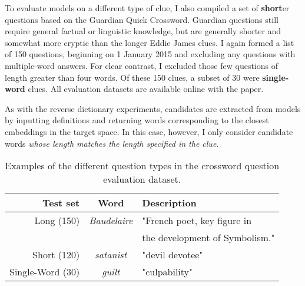 To evaluate models on a different type of clue, I also compiled a set of {\bf short}er questions based on the Guardian Quick Crossword. Guardian questions still require general factual or linguistic knowledge, but are generally shorter and somewhat more cryptic than the longer Eddie James clues. I again formed a list of 150 questions, beginning on 1 January 2015 and excluding any questions with multiple-word answers. For clear contrast, I excluded those few questions of length greater than four words. Of these 150 clues, a subset of 30 were {\bf single-word} clues. All evaluation datasets are available online with the paper. 

As with the reverse dictionary experiments, candidates are extracted from models by inputting definitions and returning words corresponding to the closest embeddings in the target space. In this case, however, I only consider candidate words \emph{whose length matches the length specified in the clue}.

\begin{table}[ht]
\centering
\begin{tabular}{r|cl}
\bf Test set & \bf Word & \bf Description \\
\hline
\rule{0pt}{4ex} 

Long (150) &   \emph{Baudelaire} & "French poet, key figure in \\ 
&& the development of Symbolism." \\ 

\rule{0pt}{5ex} 
Short (120) &   \emph{satanist} & "devil devotee" \\


\rule{0pt}{5ex} 
Single-Word (30) &   \emph{guilt} & "culpability" \\
\end{tabular}
\caption{Examples of the different question types in the crossword question evaluation dataset.}
\label{tb:tablename}
\end{table}


